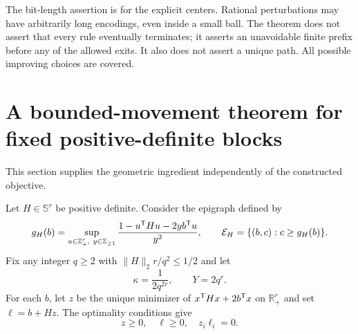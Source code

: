 \documentclass[11pt]{article}
\theoremstyle{remark}\newtheorem{remark}[theorem]{Remark}
\newcommand{\R}{\mathbb R}\newcommand{\Q}{\mathbb Q}\newcommand{\Z}{\mathbb Z}
\newcommand{\norm}[1]{\lVert #1\rVert}
\begin{document}
The bit-length assertion is for the explicit centers. Rational perturbations may have arbitrarily long encodings, even inside a small ball. The theorem does not assert that every rule eventually terminates; it asserts an unavoidable finite prefix before any of the allowed exits. It also does not assert a unique path. All possible improving choices are covered.

\section{A bounded-movement theorem for fixed positive-definite blocks}
This section supplies the geometric ingredient independently of the constructed objective.

Let $H\in\mathbb S^r$ be positive definite. Consider the epigraph defined by
\begin{equation}\label{eq:g}
 g_H(b)=\sup_{u\in\Z_+^r,\ y\in\Z_{\ge1}}
 \frac{1-u\trans Hu-2y b\trans u}{y^2},\qquad
 \mathcal E_H=\{(b,c):c\ge g_H(b)\}.
\end{equation}
Fix any integer $q\ge2$ with $\norm H_2r/q^2\le1/2$ and let
\[
 \kappa=\frac1{2q^{2r}},\qquad Y=2q^r.
\]
For each $b$, let $z$ be the unique minimizer of $x^{\mathsf T} Hx+2b^{\mathsf T} x$ on $\R_+^r$ and set $\ell=b+Hz$. The optimality conditions give
\begin{equation}\label{eq:kkt}
 z\ge0,\quad\ell\ge0,\quad z_i\ell_i=0.
\end{equation}
\end{document}
